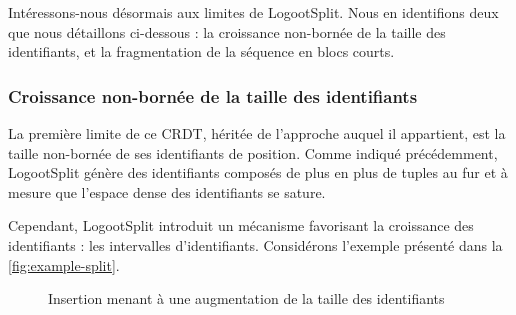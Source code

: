 Intéressons-nous désormais aux limites de LogootSplit.
Nous en identifions deux que nous détaillons ci-dessous : la croissance non-bornée de la taille des identifiants, et la fragmentation de la séquence en blocs courts.

\subsubsection{Croissance non-bornée de la taille des identifiants}

\label{sec:growth-ids-split}

La première limite de ce \ac{CRDT}, héritée de l'approche auquel il appartient, est la taille non-bornée de ses identifiants de position.
Comme indiqué précédemment, LogootSplit génère des identifiants composés de plus en plus de tuples au fur et à mesure que l'espace dense des identifiants se sature.

Cependant, LogootSplit introduit un mécanisme favorisant la croissance des identifiants : les intervalles d'identifiants.
Considérons l'exemple présenté dans la \autoref{fig:example-split}.

\begin{figure}[!ht]

  \centering
  \caption{Insertion menant à une augmentation de la taille des identifiants}
  \label{fig:example-split}
\end{figure}

